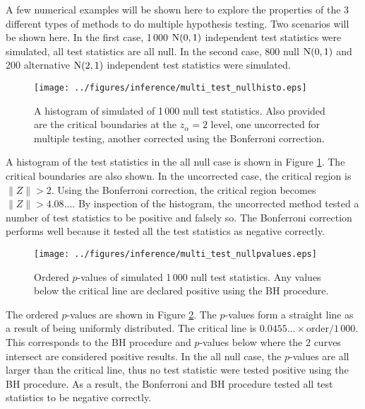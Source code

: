 A few numerical examples will be shown here to explore the properties of the 3 different types of methods to do multiple hypothesis testing. Two scenarios will be shown here. In the first case, 1\,000 $\operatorname{N}(0,1)$ independent test statistics were simulated, all test statistics are all null. In the second case, 800 null $\operatorname{N}(0,1)$ and 200 alternative $\operatorname{N}(2,1)$ independent test statistics were simulated. 

\begin{figure}
	\centering
	\texttt{[image: ../figures/inference/multi\_test\_nullhisto.eps]}
	\caption{A histogram of simulated of 1\,000 null test statistics. Also provided are the critical boundaries at the $z_\alpha=2$ level, one uncorrected for multiple testing, another corrected using the Bonferroni correction.}
	\label{fig:inference_multi_test_nullhisto}
\end{figure}

A histogram of the test statistics in the all null case is shown in Figure \ref{fig:inference_multi_test_nullhisto}. The critical boundaries are also shown. In the uncorrected case, the critical region is $\|Z\|>2$. Using the Bonferroni correction, the critical region becomes $\|Z\|>4.08...$. By inspection of the histogram, the uncorrected method tested a number of test statistics to be positive and falsely so. The Bonferroni correction performs well because it tested all the test statistics as negative correctly.

\begin{figure}
	\centering
	\texttt{[image: ../figures/inference/multi\_test\_nullpvalues.eps]}
	\caption{Ordered $p$-values of simulated 1\,000 null test statistics. Any values below the critical line are declared positive using the BH procedure.}
	\label{fig:inference_multi_test_nullpvalues}
\end{figure} 

The ordered $p$-values are shown in Figure \ref{fig:inference_multi_test_nullpvalues}. The $p$-values form a straight line as a result of being uniformly distributed. The critical line is $0.0455...\times\text{order}/1\,000$. This corresponds to the BH procedure and $p$-values below where the 2 curves intersect are considered positive results. In the all null case, the $p$-values are all larger than the critical line, thus no test statistic were tested positive using the BH procedure. As a result, the Bonferroni and BH procedure tested all test statistics to be negative correctly.

